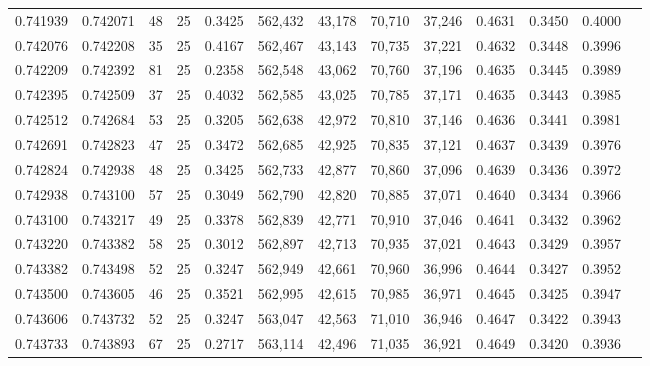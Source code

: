 \begin{tabular}{rrrrrrrrrrrrr}
0.741939 & 0.742071 &    48 &  25 &                                     0.3425 & 562,432 &  43,178 &  70,710 &  37,246 & 0.4631 & 0.3450 & 0.4000 \\
0.742076 & 0.742208 &    35 &  25 &                                     0.4167 & 562,467 &  43,143 &  70,735 &  37,221 & 0.4632 & 0.3448 & 0.3996 \\
0.742209 & 0.742392 &    81 &  25 &                                     0.2358 & 562,548 &  43,062 &  70,760 &  37,196 & 0.4635 & 0.3445 & 0.3989 \\
0.742395 & 0.742509 &    37 &  25 &                                     0.4032 & 562,585 &  43,025 &  70,785 &  37,171 & 0.4635 & 0.3443 & 0.3985 \\
0.742512 & 0.742684 &    53 &  25 &                                     0.3205 & 562,638 &  42,972 &  70,810 &  37,146 & 0.4636 & 0.3441 & 0.3981 \\
0.742691 & 0.742823 &    47 &  25 &                                     0.3472 & 562,685 &  42,925 &  70,835 &  37,121 & 0.4637 & 0.3439 & 0.3976 \\
0.742824 & 0.742938 &    48 &  25 &                                     0.3425 & 562,733 &  42,877 &  70,860 &  37,096 & 0.4639 & 0.3436 & 0.3972 \\
0.742938 & 0.743100 &    57 &  25 &                                     0.3049 & 562,790 &  42,820 &  70,885 &  37,071 & 0.4640 & 0.3434 & 0.3966 \\
0.743100 & 0.743217 &    49 &  25 &                                     0.3378 & 562,839 &  42,771 &  70,910 &  37,046 & 0.4641 & 0.3432 & 0.3962 \\
0.743220 & 0.743382 &    58 &  25 &                                     0.3012 & 562,897 &  42,713 &  70,935 &  37,021 & 0.4643 & 0.3429 & 0.3957 \\
0.743382 & 0.743498 &    52 &  25 &                                     0.3247 & 562,949 &  42,661 &  70,960 &  36,996 & 0.4644 & 0.3427 & 0.3952 \\
0.743500 & 0.743605 &    46 &  25 &                                     0.3521 & 562,995 &  42,615 &  70,985 &  36,971 & 0.4645 & 0.3425 & 0.3947 \\
0.743606 & 0.743732 &    52 &  25 &                                     0.3247 & 563,047 &  42,563 &  71,010 &  36,946 & 0.4647 & 0.3422 & 0.3943 \\
0.743733 & 0.743893 &    67 &  25 &                                     0.2717 & 563,114 &  42,496 &  71,035 &  36,921 & 0.4649 & 0.3420 & 0.3936 \\

\end{tabular}
